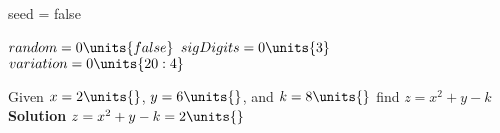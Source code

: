 seed = false

\mbox{$random = \mbox{$0 \units{ false}$}$}
\mbox{$sigDigits = \mbox{$0 \units{ 3}$}$}
\mbox{$variation = \mbox{$0 \units{ 20:4}$}$}

\question Given \mbox{$x = \mbox{$2 \units{ }$}$}, \mbox{$y = \mbox{$6 \units{ }$}$}, and \mbox{$k = \mbox{$8 \units{ }$}$} find $z = x^2+y-k$
\textbf{Solution}
\mbox{$z=x^2+y-k  = \mbox{$2 \units{ }$}$}\\ 



